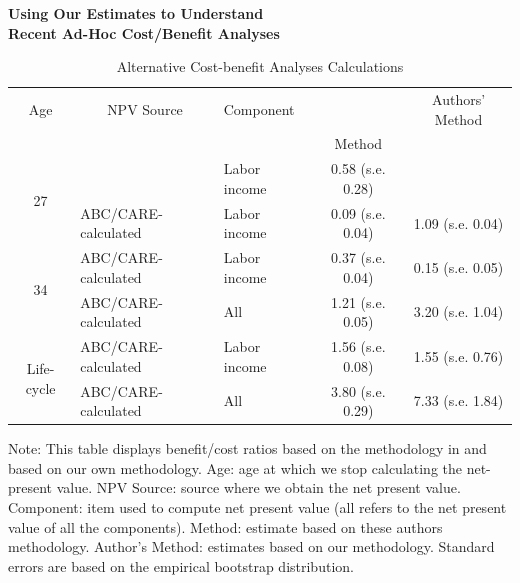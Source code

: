 \documentclass[static]{JJH-Beamer}
\newcommand{\mc}{\multicolumn}
\begin{document}
\begin{frame}

\begin{center}
\textbf{Using Our Estimates to Understand\\ Recent Ad-Hoc Cost/Benefit Analyses}
\end{center}

\end{frame}

\begin{frame}

\begin{table}[H]
\caption{Alternative Cost-benefit Analyses Calculations}\label{table:comparing}
\begin{center}
\begin{tabular}{cllcc}
\toprule
Age & \mc{1}{c}{NPV Source} & Component & \citet{Kline_Walters_2016_QJE} & Authors' Method \\
& & & Method & \\
\midrule
\multirow{2}{*}{27} & \cite{Chetty_Friedman_etal_2011_QJoE} & Labor income & 0.58 (s.e. 0.28) &  \\
& ABC/CARE-calculated & Labor income & 0.09 (s.e. 0.04) &  1.09 (s.e. 0.04)\\
\midrule
\multirow{2}{*}{34} & ABC/CARE-calculated & Labor income & 0.37 (s.e. 0.04) & 0.15 (s.e. 0.05) \\
& ABC/CARE-calculated & All & 1.21 (s.e. 0.05) &  3.20 (s.e. 1.04) \\
\midrule
\multirow{2}{*}{Life-cycle} &  ABC/CARE-calculated & Labor income & 1.56 (s.e. 0.08) & 1.55 (s.e. 0.76) \\
& ABC/CARE-calculated & All & 3.80 (s.e. 0.29) & 7.33 (s.e. 1.84) \\
\bottomrule
\end{tabular}
\end{center}
{\flushleft \tiny Note: This table displays benefit/cost ratios based on the methodology in \citet{Kline_Walters_2016_QJE} and based on our own methodology. Age: age at which we stop calculating the net-present value. NPV Source: source where we obtain the net present value. Component: item used to compute net present value (all refers to the net present value of all the components). \citet{Kline_Walters_2016_QJE} Method: estimate based on these authors methodology. Author's Method: estimates based on our methodology. Standard errors are based on the empirical bootstrap distribution.\\}
\end{table}

\end{frame}
\end{document}
